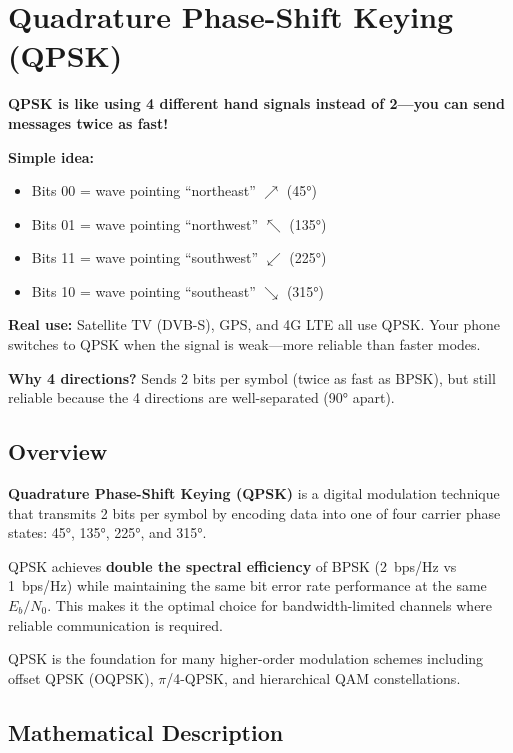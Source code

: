 \chapter{Quadrature Phase-Shift Keying (QPSK)}
\label{ch:qpsk}

\begin{nontechnical}
\textbf{QPSK is like using 4 different hand signals instead of 2---you can send messages twice as fast!}

\textbf{Simple idea:}
\begin{itemize}
\item Bits 00 = wave pointing ``northeast'' $\nearrow$ (45°)
\item Bits 01 = wave pointing ``northwest'' $\nwarrow$ (135°)
\item Bits 11 = wave pointing ``southwest'' $\swarrow$ (225°)
\item Bits 10 = wave pointing ``southeast'' $\searrow$ (315°)
\end{itemize}

\textbf{Real use:} Satellite TV (DVB-S), GPS, and 4G LTE all use QPSK. Your phone switches to QPSK when the signal is weak---more reliable than faster modes.

\textbf{Why 4 directions?} Sends 2 bits per symbol (twice as fast as BPSK), but still reliable because the 4 directions are well-separated (90° apart).
\end{nontechnical}

\section{Overview}

\textbf{Quadrature Phase-Shift Keying (QPSK)} is a digital modulation technique that transmits 2 bits per symbol by encoding data into one of four carrier phase states: 45°, 135°, 225°, and 315°.

\begin{keyconcept}
QPSK achieves \textbf{double the spectral efficiency} of BPSK (2~bps/Hz vs 1~bps/Hz) while maintaining the same bit error rate performance at the same $E_b/N_0$. This makes it the optimal choice for bandwidth-limited channels where reliable communication is required.
\end{keyconcept}

QPSK is the foundation for many higher-order modulation schemes including offset QPSK (OQPSK), $\pi$/4-QPSK, and hierarchical QAM constellations.

\section{Mathematical Description}

